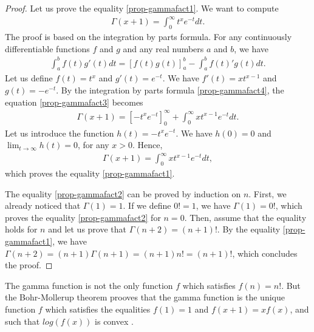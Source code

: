 \begin{proof}
Let us prove the equality \ref{prop-gammafact1}.
We want to compute 
\begin{eqnarray}
\Gamma(x+1) = \int_0^\infty t^x e^{-t} dt. \label{prop-gammafact3}
\end{eqnarray}
The proof is based on the integration by parts formula.
For any continuously differentiable functions $f$ and $g$ and 
any real numbers $a$ and $b$, we have 
\begin{eqnarray}
\int_a^b f(t)g'(t) dt = \left[ f(t)g(t) \right]_a^b - \int_a^b f(t)'g(t) dt. \label{prop-gammafact4}
\end{eqnarray}
Let us define $f(t) = t^x$ and $g'(t) = e^{-t}$. We have 
$f'(t) = xt^{x-1}$ and $g(t) = -e^{-t}$. By the integration by parts formula
\ref{prop-gammafact4}, the equation \ref{prop-gammafact3} becomes
\begin{eqnarray}
\Gamma(x+1) = \left[ -t^x e^{-t}\right]_0^\infty + \int_0^\infty x t^{x-1} e^{-t} dt.
\end{eqnarray}
Let us introduce the function $h(t) = -t^x e^{-t}$. We have $h(0) = 0$ and 
$\lim_{t\rightarrow \infty} h(t) = 0$, for any $x>0$. Hence, 
\begin{eqnarray}
\Gamma(x+1) = \int_0^\infty x t^{x-1} e^{-t} dt,
\end{eqnarray}
which proves the equality \ref{prop-gammafact1}.

The equality \ref{prop-gammafact2} can be proved by induction on 
$n$. First, we already noticed that $\Gamma(1) = 1$. 
If we define $0!=1$, we have $\Gamma(1)=0!$, which proves the 
equality \ref{prop-gammafact2} for $n=0$. 
Then, assume that the equality holds for $n$ and let us prove that 
$\Gamma(n+2) = (n+1)!$. By the equality \ref{prop-gammafact1}, we 
have $\Gamma(n+2) = (n+1)\Gamma(n+1) = (n+1)n! = (n+1)!$, which 
concludes the proof.
\end{proof}

The gamma function is not the only function $f$ which satisfies
$f(n) = n!$. But the Bohr-Mollerup theorem prooves that the gamma 
function is the unique function $f$ which satisfies the equalities $f(1)=1$ and   
$f(x+1)=xf(x)$, and such that $log(f(x))$ is convex \cite{AndrewsAskeyRoy1999}.

